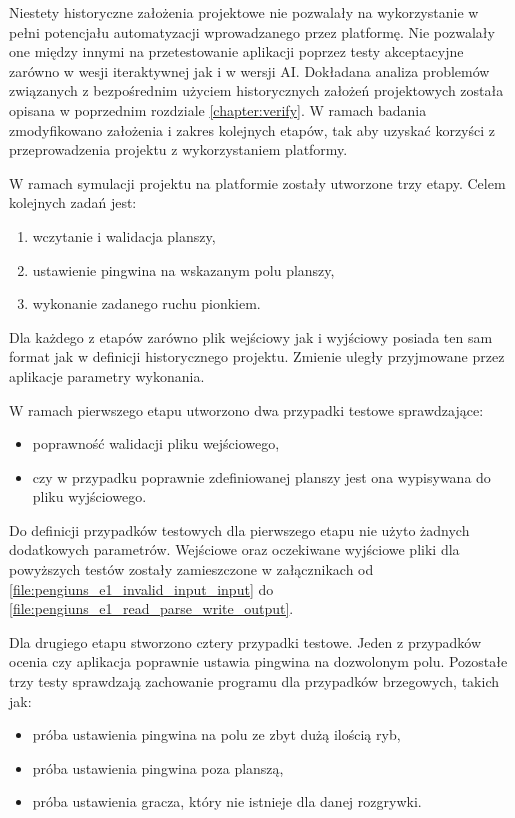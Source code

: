 Niestety historyczne założenia projektowe nie pozwalały na wykorzystanie w pełni potencjału automatyzacji wprowadzanego przez platformę.
Nie pozwalały one między innymi na przetestowanie aplikacji poprzez testy akceptacyjne zarówno w wesji iteraktywnej jak i w wersji AI.
Dokładana analiza problemów związanych z bezpośrednim użyciem historycznych założeń projektowych została opisana w poprzednim rozdziale \ref{chapter:verify}.
W ramach badania zmodyfikowano założenia i zakres kolejnych etapów, tak aby uzyskać korzyści z przeprowadzenia projektu z wykorzystaniem platformy.

W ramach symulacji projektu na platformie zostały utworzone trzy etapy.
Celem kolejnych zadań jest:
\begin{enumerate}
    \item wczytanie i walidacja planszy,
    \item ustawienie pingwina na wskazanym polu planszy,
    \item wykonanie zadanego ruchu pionkiem.
\end{enumerate}

Dla każdego z etapów zarówno plik wejściowy jak i wyjściowy posiada ten sam format jak w definicji historycznego projektu.
Zmienie uległy przyjmowane przez aplikacje parametry wykonania.


W ramach pierwszego etapu utworzono dwa przypadki testowe sprawdzające:
\begin{itemize}
    \item poprawność walidacji pliku wejściowego,
    \item czy w przypadku poprawnie zdefiniowanej planszy jest ona wypisywana do pliku wyjściowego.
\end{itemize}
Do definicji przypadków testowych dla pierwszego etapu nie użyto żadnych dodatkowych parametrów.
Wejściowe oraz oczekiwane wyjściowe pliki dla powyższych testów zostały zamieszczone w załącznikach od \ref{file:pengiuns_e1_invalid_input_input} do \ref{file:pengiuns_e1_read_parse_write_output}.


Dla drugiego etapu stworzono cztery przypadki testowe.
Jeden z przypadków ocenia czy aplikacja poprawnie ustawia pingwina na dozwolonym polu.
Pozostałe trzy testy sprawdzają zachowanie programu dla przypadków brzegowych, takich jak:
\begin{itemize}
    \item próba ustawienia pingwina na polu ze zbyt dużą ilością ryb,
    \item próba ustawienia pingwina poza planszą,
    \item próba ustawienia gracza, który nie istnieje dla danej rozgrywki.
\end{itemize}


